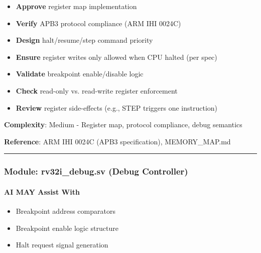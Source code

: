 \begin{record}

\begin{itemize}
\tightlist
\item
  \textbf{Approve} register map implementation
\item
  \textbf{Verify} APB3 protocol compliance (ARM IHI 0024C)
\item
  \textbf{Design} halt/\allowbreak{}resume/\allowbreak{}step command
  priority
\item
  \textbf{Ensure} register writes only allowed when CPU halted (per
  spec)
\item
  \textbf{Validate} breakpoint enable/\allowbreak{}disable logic
\item
  \textbf{Check} read-only vs. read-write register enforcement
\item
  \textbf{Review} register side-effects (e.g., STEP triggers one
  instruction)
\end{itemize}

\textbf{Complexity}: \partialmark{} Medium - Register map, protocol
compliance, debug semantics

\textbf{Reference}: ARM IHI 0024C (APB3 specification),
MEMORY\_\allowbreak{}MAP.md

\begin{center}\rule{0.5\linewidth}{0.5pt}\end{center}

\end{record}

\subsubsection{\texorpdfstring{Module: rv32i\_\allowbreak{}debug.sv
(Debug Controller)}{Module: rv32i\_debug.sv (Debug Controller)}}\label{cr:status:phase1-ai-human-responsibilities:module-rv32i-debugsv-debug-controller}

\paragraph{\texorpdfstring{\ok{} AI MAY Assist
With}{ AI MAY Assist With}}\label{cr:status:phase1-ai-human-responsibilities:white-check-mark-ai-may-assist-with-8}

\begin{record}

\begin{itemize}
\tightlist
\item
  Breakpoint address comparators
\item
  Breakpoint enable logic structure
\item
  Halt request signal generation
\end{itemize}

\end{record}

